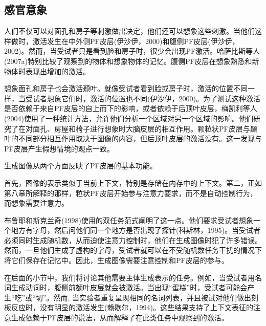 \subsection{感官意象}
\par
人们不仅可以对面孔和房子等刺激做出决定，他们还可以想象这些刺激。当他们这样做时，激活发生在中外侧PF皮层(伊沙伊，2000)和腹侧PF皮层(伊沙伊，2002)。然而，当受试者只是看到脸和房子时，很少会出现PF激活。哈萨比斯等人(2007a)特别比较了观察到的物体和想象物体的记忆。腹侧PF皮层在想象熟悉和新物体时表现出增加的激活。
\par
想象面孔和房子也会激活颞叶。就像受试者看到脸或房子时，激活的位置不同一样，当受试者想象它们时，激活的位置也不同(伊沙伊，2000)。为了测试这种激活是否依赖于来自PF皮层的自上而下的影响，或者依赖于后顶叶皮层，梅凯利等人(2004)使用了一种统计方法，允许他们分析一个区域对另一个区域的影响。他们研究了在对面孔、房屋和椅子进行想象时大脑皮层的相互作用。颗粒状PF皮层与颞叶的不同部分相互作用取决于图像的内容，但后顶叶皮层的激活没有。这一发现与PF皮层产生假想情境的观点一致。
\par
生成图像从两个方面反映了PF皮层的基本功能。
\par
首先，图像的表示类似于当前上下文，特别是存储在内存中的上下文。第二，正如第八章所解释的那样，粒状PF皮层开始参与注意力要求，而不是自动控制行为，而想象需要注意力。
\par
布鲁耶和斯克兰奇(1998)使用的双任务范式阐明了这一点。他们要求受试者想象一个地方有字母，然后问他们同一个地方是否出现了探针(科斯林，1995)。当受试者必须同时生成随机数，从而迫使注意力控制时，他们在生成图像时犯了许多错误。然而，一旦他们生成了虚构的字母，受试者就可以在不受随机数任务干扰的情况下将它们保存在记忆中。因此，生成图像需要注意控制和PF皮层的参与。
\par
在后面的小节中，我们将讨论其他需要主体生成表示的任务。例如，当受试者用名词生成动词时，腹侧前额叶皮层就会被激活。当出现“蛋糕”时，受试者可能会产生“吃”或“切”。然而, 当实验者重复呈现相同的名词列表，并且被试对他们做出刻板反应时，没有明显的激活发生(赖歇尔，1994)。这些结果支持了上下文表征的注意生成依赖于PF皮层的说法，从而解释了在此类任务中观察到的激活。
